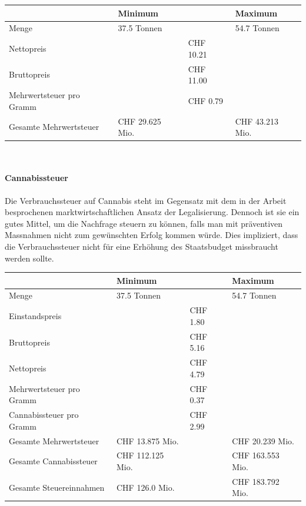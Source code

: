 \documentclass[../main.tex]{subfiles}
\begin{document}
     \noindent
	 \captionsetup{font=small}
	 \label{table:mwst-illegal}
	 \begin{tabularx}{\textwidth}{X p{3.5cm} p{2.5cm} p{3.5cm}}
     	\toprule
     	\phantom{x} & Minimum & & Maximum \\
        \midrule
        Menge & 37.5 Tonnen & & 54.7 Tonnen \\
        \midrule
        Nettopreis & & CHF 10.21 & \\
        \midrule
        Bruttopreis & & CHF 11.00 & \\
        \midrule
        Mehrwertsteuer pro Gramm & & CHF 0.79 & \\
        \midrule
        Gesamte Mehrwertsteuer & CHF 29.625 Mio. & & CHF 43.213 Mio.\\
        \bottomrule
     \end{tabularx}\\
	 
	 
	 
	 
	 \paragraph{Cannabissteuer}
	 Die Verbrauchssteuer auf Cannabis steht im Gegensatz mit dem in der Arbeit besprochenen marktwirtschaftlichen Ansatz der Legalisierung.
	 Dennoch ist sie ein gutes Mittel, um die Nachfrage steuern zu können, falls man mit präventiven Massnahmen nicht zum gewünschten Erfolg kommen würde.
	 Dies impliziert, dass die Verbrauchssteuer nicht für eine Erhöhung des Staatsbudget missbraucht werden sollte.	 
	 
	 \noindent
	 \captionsetup{font=small}
	 \label{table:cannabissteuer}
	 \begin{tabularx}{\textwidth}{X p{3.5cm} p{2.5cm} p{3.5cm}}
     	\toprule
     	\phantom{x} & Minimum & & Maximum \\
        \midrule
        Menge & 37.5 Tonnen & & 54.7 Tonnen \\
        \midrule
        Einstandspreis & & CHF 1.80 & \\
        \midrule
        Bruttopreis & & CHF 5.16 & \\
        \midrule
        Nettopreis & & CHF 4.79 & \\
        \midrule
        Mehrwertsteuer pro Gramm & & CHF 0.37 & \\
        \midrule
        Cannabissteuer pro Gramm & & CHF 2.99 & \\
        \midrule
        Gesamte Mehrwertsteuer & CHF 13.875 Mio. & & CHF 20.239 Mio.\\
        \midrule
        Gesamte Cannabissteuer & CHF 112.125 Mio. & & CHF 163.553 Mio.\\
        \midrule
        Gesamte Steuereinnahmen & CHF 126.0 Mio. & & CHF 183.792 Mio.\\
        \bottomrule
     \end{tabularx}\\ \\ \\
     
\end{document}
